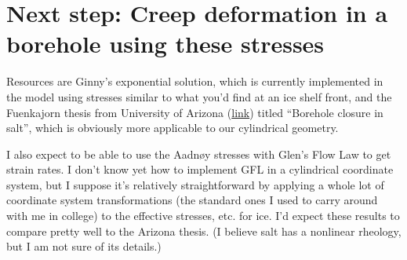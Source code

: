 \documentclass[11pt]{article}
\begin{document}
\section*{Next step: Creep deformation in a borehole using these stresses}

Resources are Ginny's exponential solution, which is currently implemented in the model using stresses similar to what you'd find at an ice shelf front, and the Fuenkajorn thesis from University of Arizona (\href{https://repository.arizona.edu/handle/10150/184451}{link}) titled ``Borehole closure in salt'', which is obviously more applicable to our cylindrical geometry.  

I also expect to be able to use the Aadn\o{}y stresses with Glen's Flow Law to get strain rates.  I don't know yet how to implement GFL in a cylindrical coordinate system, but I suppose it's relatively straightforward by applying a whole lot of coordinate system transformations (the standard ones I used to carry around with me in college) to the effective stresses, etc. for ice.  I'd expect these results to compare pretty well to the Arizona thesis.  (I believe salt has a nonlinear rheology, but I am not sure of its details.)
\end{document}
